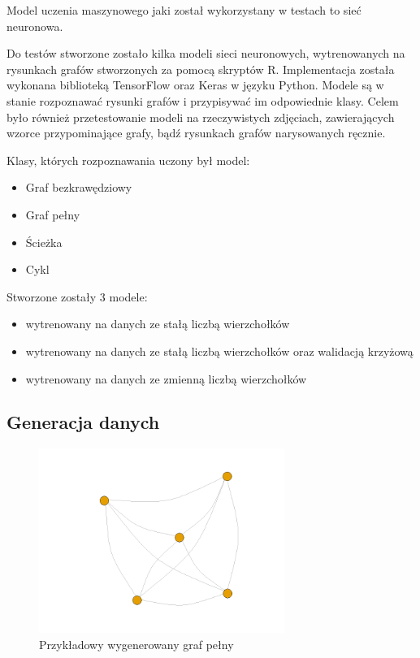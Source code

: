 Model uczenia maszynowego jaki został wykorzystany w testach to sieć neuronowa.

Do testów stworzone zostało kilka modeli sieci neuronowych,
wytrenowanych na rysunkach grafów stworzonych za pomocą skryptów R.
Implementacja została wykonana biblioteką TensorFlow oraz Keras w języku Python.
Modele są w stanie rozpoznawać rysunki grafów i przypisywać im odpowiednie klasy.
Celem było również przetestowanie modeli na rzeczywistych zdjęciach,
zawierających wzorce przypominające grafy, bądź rysunkach grafów narysowanych ręcznie.

Klasy, których rozpoznawania uczony był model:
\begin{itemize}[label=-,labelsep=0.4cm,leftmargin=0.6cm]
	\item Graf bezkrawędziowy
	\item Graf pełny
	\item Ścieżka
	\item Cykl
\end{itemize}

Stworzone zostały 3 modele:
\begin{itemize}[label=-,labelsep=0.4cm,leftmargin=0.6cm]
	\item wytrenowany na danych ze stałą liczbą wierzchołków
	\item wytrenowany na danych ze stałą liczbą wierzchołków oraz walidacją krzyżową
	\item wytrenowany na danych ze zmienną liczbą wierzchołków
\end{itemize}

\subsection{Generacja danych}

\begin{figure}[ht]
	\centering
	\includegraphics[height=6cm]{partials/images/graph_full.png}
	\caption{Przykładowy wygenerowany graf pełny}
	\label{Fig:tests-generation-1}
\end{figure}
\FloatBarrier

